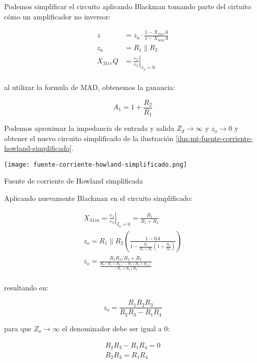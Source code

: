Podemos simplificar el circuito aplicando Blackman tomando parte del cirtuito cómo un amplificador no inversor:

\begin{align*}
    z & = z_a \cdot \frac{1 - X_{3icc}A}{1 - X_{3ica}A} \\
    z_a & = R_1 \parallel R_2 \\
    X_{31cc} Q& = \left. \frac{e_1}{e_3} \right|_{v_a=0} \\
\end{align*}

al utilizar la formula de MAD, obtenemos la ganancia:

\begin{equation}
    A_1 = 1 + \frac{R_2}{R_1}
\end{equation}

Podemos aproximar la impedancia de entrada y salida $Z_d \rightarrow \infty $ y $z_o \rightarrow 0$ y obtener el nuevo circuito simplificado de la ilustración \ref{ilus:mt-fuente-corriente-howland-simplificado}.

\begin{ilustracion}[ht]
    \centering
    \texttt{[image: fuente-corriente-howland-simplificado.png]}
    \caption{Fuente de corriente de Howland simplificada}
    \label{ilus:mt-fuente-corriente-howland-simplificado}    
\end{ilustracion}

Aplicando nuevamente Blackman en el circuito simplificado:

\begin{align*}
    X_{31ca} = \left. \frac{e_1}{e_3} \right|_{I_a=0} = \frac{R_1}{R_1 + R_2} \\
    z_o = R_1 \parallel R_2 (\frac{1 - 0A}{1 - \frac{R_1}{R_1 + R_2}(1 + \frac{R_4}{R_3})}) \\
    z_o = \frac{R_1 R_2 / R_1 + R_2}{\frac{R_3(R_1 + R_2) - R_1(R_3 + R_4)}{(R_1 + R_2)R_3}} \\
\end{align*}

resultando en:

\begin{equation}
    z_o = \frac{R_1 R_2 R_3}{R_2 R_3 - R_1 R_4}
\end{equation}

para que $Z_o \rightarrow\infty$ el denominador debe ser igual a 0:

\begin{align*}
    R_2 R_3 - R_1 R_4 = 0 \\
    R_2 R_3 = R_1 R_4
\end{align*}

